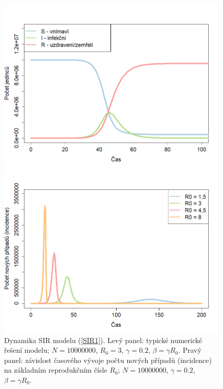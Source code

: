 \begin{figure}[ht]
\begin{center}
	\begin{minipage}[m]{0.45\linewidth}
		\includegraphics[width=0.99\textwidth]{pic/figsir1.png}
	\end{minipage}
	\hspace{2ex}
	\begin{minipage}[m]{0.45\linewidth}
		\includegraphics[width=0.99\textwidth]{pic/figsir2.png}
	\end{minipage}
\end{center}
\caption{Dynamika SIR modelu (\ref{SIR1}). Levý panel: typické numerické řešení modelu; $N=10000000$, $R_0=3$, $\gamma=0.2$, $\beta=\gamma R_0$. Pravý panel: závislost časového vývoje počtu nových případů (incidence) na základním reprodukčním čísle $R_0$; $N=10000000$, $\gamma=0.2$, $\beta=\gamma R_0$.}
\label{kendrick1}
\end{figure}

